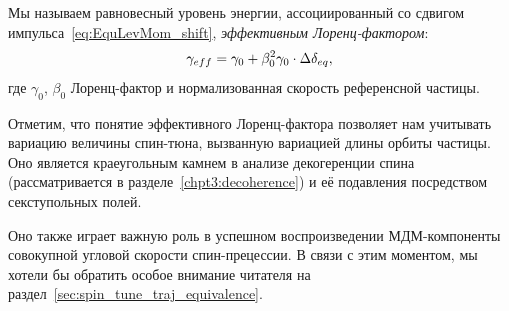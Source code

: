 Мы называем равновесный уровень энергии, ассоциированный со сдвигом импульса~\eqref{eq:EquLevMom_shift},
\emph{эффективным Лоренц-фактором}:
\begin{equation}\label{eq:EffectiveGamma}
\g*= \gamma_0 + \beta_0^2\gamma_0\cdot\Delta\delta_{eq},
\end{equation}
где $\gamma_0$, $\beta_0$ Лоренц-фактор и нормализованная скорость референсной частицы.

Отметим, что понятие эффективного Лоренц-фактора позволяет нам учитывать вариацию величины спин-тюна,
вызванную вариацией длины орбиты частицы. Оно является краеугольным камнем в анализе 
декогеренции спина (рассматривается в разделе~\ref{chpt3:decoherence}) и её подавления посредством секступольных полей.

Оно также играет важную роль в успешном воспроизведении МДМ-компоненты совокупной угловой скорости
спин-прецессии. В связи с этим моментом, мы хотели бы обратить особое внимание читателя на раздел~\ref{sec:spin_tune_traj_equivalence}.